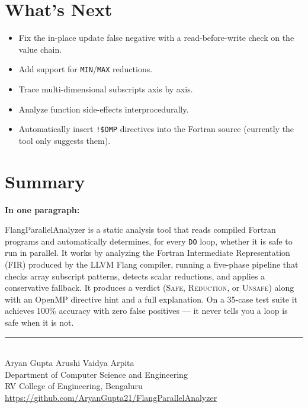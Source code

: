 \documentclass[12pt,a4paper]{article}
\begin{document}
\section{What's Next}

\begin{itemize}[leftmargin=1.5em, itemsep=4pt]
  \item Fix the in-place update false negative with a read-before-write
        check on the value chain.
  \item Add support for \texttt{MIN}/\texttt{MAX} reductions.
  \item Trace multi-dimensional subscripts axis by axis.
  \item Analyze function side-effects interprocedurally.
  \item Automatically insert \texttt{!\$OMP} directives into the
        Fortran source (currently the tool only suggests them).
\end{itemize}

\section{Summary}

\begin{infobox}
\textbf{In one paragraph:}

FlangParallelAnalyzer is a static analysis tool that reads compiled
Fortran programs and automatically determines, for every \texttt{DO}
loop, whether it is safe to run in parallel. It works by analyzing the
Fortran Intermediate Representation (FIR) produced by the LLVM Flang
compiler, running a five-phase pipeline that checks array subscript
patterns, detects scalar reductions, and applies a conservative
fallback. It produces a verdict (\textsc{Safe}, \textsc{Reduction}, or
\textsc{Unsafe}) along with an OpenMP directive hint and a full
explanation. On a 35-case test suite it achieves 100\% accuracy with
zero false positives --- it never tells you a loop is safe when it is
not.
\end{infobox}

\vfill
\begin{center}
{\color{navyblue}\rule{0.5\linewidth}{1pt}}\\[6pt]
{\small\color{darkgray}
Aryan Gupta \quad Arushi Vaidya \quad Arpita\\
Department of Computer Science and Engineering\\
RV College of Engineering, Bengaluru\\[4pt]
\url{https://github.com/AryanGupta21/FlangParallelAnalyzer}
}
\end{center}
\end{document}
